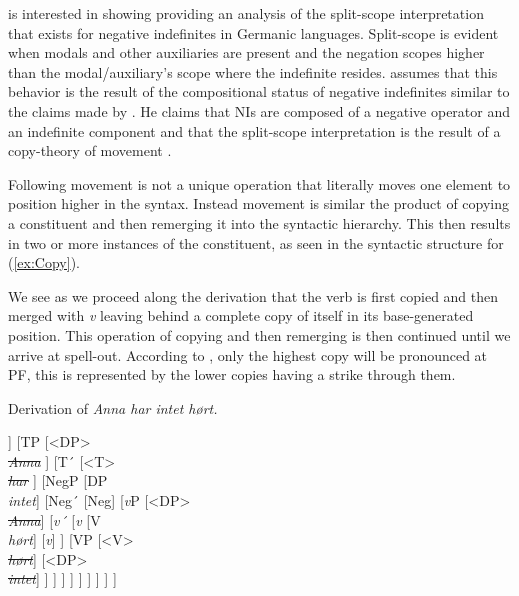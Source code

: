 \documentclass[12pt, letterpaper]{article}
\begin{document}
\citet{zeijlstraSyntacticallyComplexStatus2011} is interested in showing providing an analysis of the split-scope interpretation that exists for negative indefinites in Germanic languages. Split-scope is evident when modals and other auxiliaries are present and the negation scopes higher than the modal/auxiliary's scope where the indefinite resides. \citeauthor{zeijlstraSyntacticallyComplexStatus2011} assumes that this behavior is the result of the compositional status of negative indefinites similar to the claims made by \citet{iatridouNegativeDPsAMovement2011}. He claims that NIs are composed of a negative operator and an indefinite component and that the split-scope interpretation is the result of a copy-theory of movement \citep{chomskyMinimalistProgram2015}. 

Following \citeauthor{chomskyMinimalistProgram2015} movement is not a unique operation that literally moves one element to position higher in the syntax. Instead movement is similar the product of copying a constituent and then remerging it into the syntactic hierarchy. This then results in two or more instances of the constituent, as seen in the syntactic structure for (\ref{ex:Copy}). 

We see as we proceed along the derivation that the verb is first copied and then merged with \emph{v} leaving behind a complete copy of itself in its base-generated position. This operation of copying and then remerging is then continued until we arrive at spell-out. According to \citet{chomskyMinimalistProgram2015}, only the highest copy will be pronounced at PF, this is represented by the lower copies having a strike through them. 

\ea Derivation of \emph{Anna har intet hørt.} \label{ex:Copy}\\
\begin{forest}
	[CP [DP\\\emph{Anna}] [C´ [C [T\\\emph{har} ] [C] ] [TP [<DP>\\\sout{\emph{Anna}} ] [T´ [<T>\\\sout{\emph{har}} ] [NegP [DP\\\emph{intet}] [Neg´ [Neg] [\emph{v}P [<DP>\\\sout{\emph{Anna}}] [\emph{v´} [\emph{v} [V\\\emph{hørt}] [\emph{v}] ] [VP [<V>\\\emph{\sout{hørt}}] [<DP>\\\sout{\emph{intet}}] ] ] ] ] ] ] ] ] ] 
\end{forest}
\z 
\end{document}
